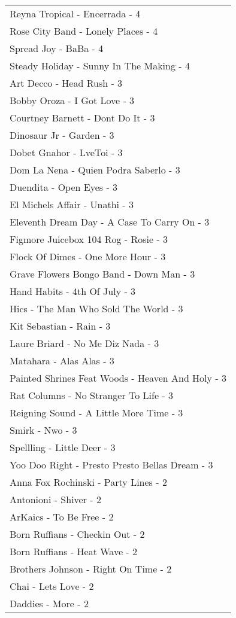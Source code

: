 \documentclass[
]{article}
\begin{document}
\begin{longtable}{l}
Reyna Tropical - Encerrada - 4 \\ 
Rose City Band - Lonely Places - 4 \\ 
Spread Joy - BaBa - 4 \\ 
Steady Holiday - Sunny In The Making - 4 \\ 
Art Decco - Head Rush - 3 \\ 
Bobby Oroza - I Got Love - 3 \\ 
Courtney Barnett - Dont Do It - 3 \\ 
Dinosaur Jr - Garden - 3 \\ 
Dobet Gnahor - LveToi - 3 \\ 
Dom La Nena - Quien Podra Saberlo - 3 \\ 
Duendita - Open Eyes - 3 \\ 
El Michels Affair - Unathi - 3 \\ 
Eleventh Dream Day - A Case To Carry On - 3 \\ 
Figmore Juicebox 104 Rog - Rosie - 3 \\ 
Flock Of Dimes - One More Hour - 3 \\ 
Grave Flowers Bongo Band - Down Man - 3 \\ 
Hand Habits - 4th Of July - 3 \\ 
Hics - The Man Who Sold The World - 3 \\ 
Kit Sebastian - Rain - 3 \\ 
Laure Briard - No Me Diz Nada - 3 \\ 
Matahara - Alas Alas - 3 \\ 
Painted Shrines Feat Woods - Heaven And Holy - 3 \\ 
Rat Columns - No Stranger To Life - 3 \\ 
Reigning Sound - A Little More Time - 3 \\ 
Smirk - Nwo - 3 \\ 
Spellling - Little Deer - 3 \\ 
Yoo Doo Right - Presto Presto Bellas Dream - 3 \\ 
Anna Fox Rochinski - Party Lines - 2 \\ 
Antonioni - Shiver - 2 \\ 
ArKaics - To Be Free - 2 \\ 
Born Ruffians - Checkin Out - 2 \\ 
Born Ruffians - Heat Wave - 2 \\ 
Brothers Johnson - Right On Time - 2 \\ 
Chai - Lets Love - 2 \\ 
Daddies - More - 2 \\ 

\end{longtable}
\end{document}
